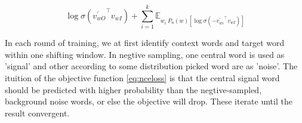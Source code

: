   \begin{equation}\label{eq:nceloss}
  \log{\sigma({v^\prime_{wO}}^\intercal v_{wI})}+\sum_{i=1}^k{\mathbb{E}_{w_i~P_n(w)[\log{\sigma({-v^\prime_{wi}}^\intercal v_{wI})}]}}
  \end{equation}

  In each round of training, we at first identify context words and target word within one shifting window. In negtive sampling, one central word is used as 'signal' and other according to some distribution picked word are as 'noise'. The ituition of the objective function \ref{eq:nceloss} is that the central signal word should be predicted with higher probability than the negtive-sampled, background noise words, or else the objective will drop. These iterate until the result convergent.
